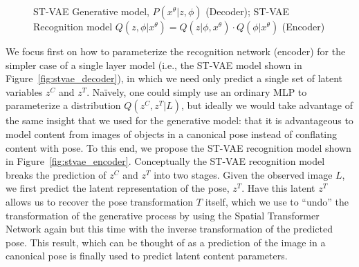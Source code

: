 \begin{figure}[t]
\begin{center}
\qquad\qquad
{}\vspace{-4mm}
\end{center}
 \caption{\footnotesize
  ST-VAE Generative model, $P(x^\theta | z,\phi)$ (Decoder);  ST-VAE Recognition model $Q(z,\phi |x^\theta) = Q(z | \phi,x^\theta)\cdot Q(\phi|x^\theta)$ (Encoder)   
 }
 
\label{fig:stvaemodel}
\end{figure}


We focus first on how to parameterize the recognition network (encoder) for the simpler case of a single layer model (i.e., the ST-VAE model
shown in Figure~\ref{fig:stvae_decoder}), in which we need only predict a single set of latent variables $z^C$ and $z^T$.
Na\"{i}vely, one could 
simply use an ordinary MLP to parameterize a distribution $Q(z^C, z^T | L)$, but ideally we would take advantage of the same
 insight that we used for the generative model: that it is advantageous to model content from images of objects in a canonical pose instead
 of conflating content with pose.  To this end, we propose the ST-VAE recognition model shown in Figure~\ref{fig:stvae_encoder}. 
Conceptually the ST-VAE recognition model breaks the prediction of $z^C$ and $z^T$ into two stages.  Given the observed image $L$,
we first predict the latent representation of the pose, $z^T$.  Have this latent $z^T$ allows us to recover the pose transformation 
$T$ itself, which we use to ``undo'' the transformation of the generative process
by using the Spatial Transformer Network again but this time with the inverse transformation of the predicted pose.  This result, which can be
thought of as a prediction of the image in a canonical pose is finally used to predict latent content parameters.


